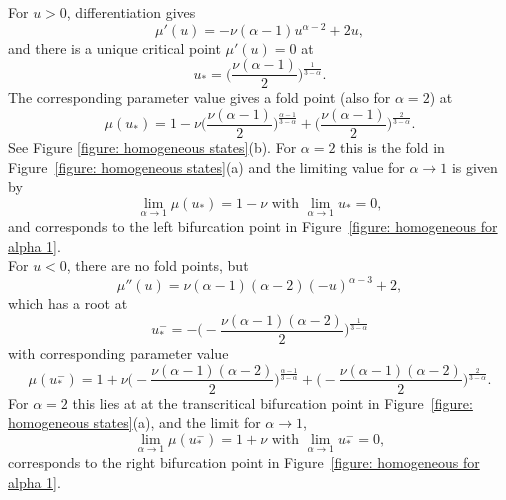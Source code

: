 \documentclass{article}
\numberwithin{equation}{section}
\begin{document}
\noindent For $u>0$, differentiation gives
		\begin{equation}
			\mu '(u) = - \nu (\alpha-1) u^{\alpha-2} + 2u,
		\end{equation}
		and there is a unique critical point $\mu '(u) = 0$ at 
		\begin{equation}\label{e:homeqcrit}
			u_* = \biggl( \frac{\nu(\alpha-1)}{2} \biggr) ^{\frac{1}{3-\alpha}} .
		\end{equation}
		The corresponding parameter value gives a fold point (also for $\alpha=2$) at
		\begin{equation}
			\mu (u_*) = 1- \nu \biggl( \frac{\nu(\alpha-1)}{2} \biggr)^{\frac{\alpha-1}{3-\alpha}} + \biggl( \frac{\nu(\alpha-1)}{2} \biggr)^{\frac{2}{3-\alpha}} .
		\end{equation}   
		See Figure \ref{figure: homogeneous states}(b). For $\alpha=2$ this is the fold in Figure~\ref{figure: homogeneous states}(a) and the limiting value for $\alpha\to 1$ is given by
		\begin{equation}
			\lim_{\alpha\rightarrow 1} \mu(u_*) = 1- \nu \text{ with } \lim_{\alpha\rightarrow 1} u_* = 0 ,
		\end{equation}
		and corresponds to the left bifurcation point in Figure~\ref{figure: homogeneous for alpha 1}. \\
		\noindent For $u<0$, there are no fold points, but  
		\begin{equation}
			\mu ''(u)  =\nu (\alpha -1)(\alpha-2)(-u)^{\alpha-3} +2, 
		\end{equation}
		which has a root at 
		\begin{equation}
			u_*^- = - \biggl( - \frac{\nu (\alpha-1)(\alpha-2)}{2} \biggr) ^{\frac{1}{3-\alpha}} 
		\end{equation}
		with corresponding parameter value 
		\begin{equation}
			\mu (u_*^-) = 1+ \nu \biggl( - \frac{\nu(\alpha-1)(\alpha-2)}{2}\biggr)^{\frac{\alpha-1}{3-\alpha}} + \biggl( - \frac{\nu (\alpha-1)(\alpha-2)}{2} \biggr)^{\frac{2}{3-\alpha}} .
		\end{equation} 
		For $\alpha=2$ this lies at at the transcritical bifurcation point in Figure~\ref{figure: homogeneous states}(a), and the limit for $\alpha\to1$, 
		\begin{equation}
			\lim_{\alpha\rightarrow 1} \mu (u_*^-) = 1 + \nu \text{ with } \lim_{\alpha\rightarrow 1} u_*^- = 0 ,
		\end{equation}
		corresponds to the right bifurcation point in Figure~\ref{figure: homogeneous for alpha 1}. 
\end{document}
